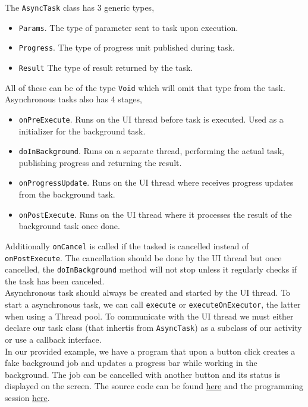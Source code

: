 The \texttt{AsyncTask} class has 3 generic types,
\begin{itemize}
\item \texttt{Params}. The type of parameter sent to task upon execution.
\item \texttt{Progress}. The type of progress unit published during task.
\item \texttt{Result} The type of result returned by the task.
\end{itemize}
All of these can be of the type \texttt{Void} which will omit that type from the task. Asynchronous tasks also has 4 stages,
\begin{itemize}
\item \texttt{onPreExecute}. Runs on the UI thread before task is executed. Used as a initializer for the background task.
\item \texttt{doInBackground}. Runs on a separate thread, performing the actual task, publishing progress and returning the result.
\item \texttt{onProgressUpdate}. Runs on the UI thread where receives progress updates from the background task.
\item \texttt{onPostExecute}. Runs on the UI thread where it processes the result of the background task once done.
\end{itemize}
Additionally \texttt{onCancel} is called if the tasked is cancelled instead of \texttt{onPostExecute}. The cancellation should be done by the UI thread but once cancelled, the \texttt{doInBackground} method will not stop unless it regularly checks if the task has been canceled.\\

Asynchronous task should always be created and started by the UI thread. To start a asynchronous task, we can call \texttt{execute} or \texttt{executeOnExecutor}, the latter when using a Thread pool. To communicate with the UI thread we must either declare our task class (that inhertis from \texttt{AsyncTask}) as a subclass of our activity or use a callback interface.\\

In our provided example, we have a program that upon a button click creates a fake background job and updates a progress bar while working in the background. The job can be cancelled with another button and its status is displayed on the screen. The source code can be found \href{https://github.com/JonSteinn/AndroidDevelopment/tree/master/examples/lab2/asynctask}{here} and the programming session \href{https://youtu.be/hNRu4tYNg10}{here}.

